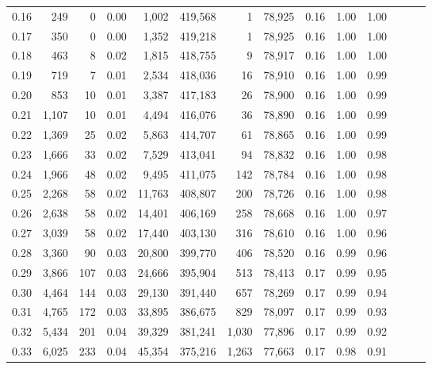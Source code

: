 \begin{tabular}{rrrrrrrrrrrrrr}
0.16 &     249 &      0 &  0.00 &    1,002 &  419,568 &       1 &  78,925 &  0.16 &  1.00 &      1.00 \\
0.17 &     350 &      0 &  0.00 &    1,352 &  419,218 &       1 &  78,925 &  0.16 &  1.00 &      1.00 \\
0.18 &     463 &      8 &  0.02 &    1,815 &  418,755 &       9 &  78,917 &  0.16 &  1.00 &      1.00 \\
0.19 &     719 &      7 &  0.01 &    2,534 &  418,036 &      16 &  78,910 &  0.16 &  1.00 &      0.99 \\
0.20 &     853 &     10 &  0.01 &    3,387 &  417,183 &      26 &  78,900 &  0.16 &  1.00 &      0.99 \\
0.21 &   1,107 &     10 &  0.01 &    4,494 &  416,076 &      36 &  78,890 &  0.16 &  1.00 &      0.99 \\
0.22 &   1,369 &     25 &  0.02 &    5,863 &  414,707 &      61 &  78,865 &  0.16 &  1.00 &      0.99 \\
0.23 &   1,666 &     33 &  0.02 &    7,529 &  413,041 &      94 &  78,832 &  0.16 &  1.00 &      0.98 \\
0.24 &   1,966 &     48 &  0.02 &    9,495 &  411,075 &     142 &  78,784 &  0.16 &  1.00 &      0.98 \\
0.25 &   2,268 &     58 &  0.02 &   11,763 &  408,807 &     200 &  78,726 &  0.16 &  1.00 &      0.98 \\
0.26 &   2,638 &     58 &  0.02 &   14,401 &  406,169 &     258 &  78,668 &  0.16 &  1.00 &      0.97 \\
0.27 &   3,039 &     58 &  0.02 &   17,440 &  403,130 &     316 &  78,610 &  0.16 &  1.00 &      0.96 \\
0.28 &   3,360 &     90 &  0.03 &   20,800 &  399,770 &     406 &  78,520 &  0.16 &  0.99 &      0.96 \\
0.29 &   3,866 &    107 &  0.03 &   24,666 &  395,904 &     513 &  78,413 &  0.17 &  0.99 &      0.95 \\
0.30 &   4,464 &    144 &  0.03 &   29,130 &  391,440 &     657 &  78,269 &  0.17 &  0.99 &      0.94 \\
0.31 &   4,765 &    172 &  0.03 &   33,895 &  386,675 &     829 &  78,097 &  0.17 &  0.99 &      0.93 \\
0.32 &   5,434 &    201 &  0.04 &   39,329 &  381,241 &   1,030 &  77,896 &  0.17 &  0.99 &      0.92 \\
0.33 &   6,025 &    233 &  0.04 &   45,354 &  375,216 &   1,263 &  77,663 &  0.17 &  0.98 &      0.91 \\

\end{tabular}
